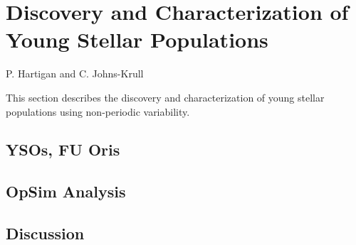 
%
%
%
%
%
%

\section{Discovery and Characterization of Young Stellar Populations}
\def\secname{youngstars}\label{sec:\secname}

P. Hartigan and C. Johns-Krull 


This section describes the discovery and characterization of young stellar populations using non-periodic variability. 

\subsection{YSOs, FU Oris}



\subsection{OpSim Analysis}
\label{sec:\secname:analysis}




\subsection{Discussion}
\label{sec:\secname:discussion}


\navigationbar
